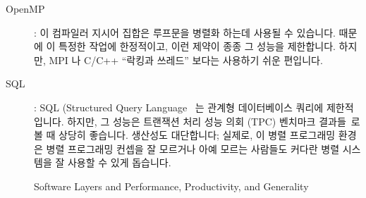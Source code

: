 \begin{description}
\item[OpenMP]: 이 컴파일러 지시어 집합은 루프문을 병렬화 하는데 사용될 수
	있습니다.
	때문에 이 특정한 작업에 한정적이고, 이런 제약이 종종 그 성능을
	제한합니다.
	하지만, MPI 나 C/C++ ``락킹과 쓰레드'' 보다는 사용하기 쉬운 편입니다.

\item[SQL]: SQL (Structured Query Language~\cite{DIS9075SQL92} 는 관계형
	데이터베이스 쿼리에 제한적입니다.
	하지만, 그 성능은 트랜잭션 처리 성능 의회 (TPC) 벤치마크
	결과들~\cite{TPC}로 볼 때 상당히 좋습니다.
	생산성도 대단합니다; 실제로, 이 병렬 프로그래밍 환경은 병렬 프로그래밍
	컨셉을 잘 모르거나 아예 모르는 사람들도 커다란 병렬 시스템을 잘 사용할
	수 있게 돕습니다.

\end{description}

\begin{figure}[tb]
\begin{center}
\end{center}
\caption{Software Layers and Performance, Productivity, and Generality}
\label{fig:intro:Software Layers and Performance, Productivity, and Generality}
\end{figure}

